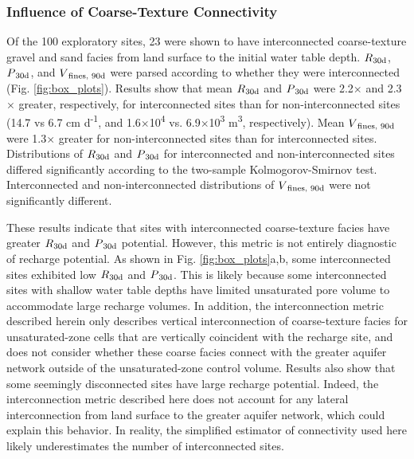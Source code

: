\subsubsection{Influence of Coarse-Texture Connectivity} \label{sssec:R_connectivity}

Of the 100 exploratory sites, 23 were shown to have interconnected coarse-texture gravel and sand facies from land surface to the initial water table depth. $R\textsubscript{30d}$, $P\textsubscript{30d}$, and $V\textsubscript{fines, 90d}$ were parsed according to whether they were interconnected (Fig. \ref{fig:box_plots}). Results show that mean $R\textsubscript{30d}$ and $P\textsubscript{30d}$ were 2.2$\times$ and 2.3$\times$ greater, respectively, for interconnected sites than for non-interconnected sites (14.7 vs 6.7 cm d\textsuperscript{-1}, and 1.6$\times$10\textsuperscript{4} vs. 6.9$\times$10\textsuperscript{3} m\textsuperscript{3}, respectively). Mean $V\textsubscript{fines, 90d}$ were 1.3$\times$ greater for non-interconnected sites than for interconnected sites.  Distributions of $R\textsubscript{30d}$ and $P\textsubscript{30d}$ for interconnected and non-interconnected sites differed significantly according to the two-sample Kolmogorov-Smirnov test. Interconnected and non-interconnected distributions of $V\textsubscript{fines, 90d}$ were not significantly different.

These results indicate that sites with interconnected coarse-texture facies have greater $R\textsubscript{30d}$ and $P\textsubscript{30d}$ potential. However, this metric is not entirely diagnostic of recharge potential. As shown in Fig. \ref{fig:box_plots}a,b, some interconnected sites exhibited low $R\textsubscript{30d}$ and $P\textsubscript{30d}$. This is likely because some interconnected sites with shallow water table depths have limited unsaturated pore volume to accommodate large recharge volumes. In addition, the interconnection metric described herein only describes vertical interconnection of coarse-texture facies for unsaturated-zone cells that are vertically coincident with the recharge site, and does not consider whether these coarse facies connect with the greater aquifer network outside of the unsaturated-zone control volume. Results also show that some seemingly disconnected sites have large recharge potential. Indeed, the interconnection metric described here does not account for any lateral interconnection from land surface to the greater aquifer network, which could explain this behavior. In reality, the simplified estimator of connectivity used here likely underestimates the number of interconnected sites.

